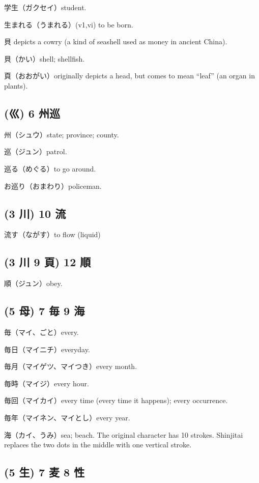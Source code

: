 学生（ガクセイ）student.

生まれる（うまれる）(v1,vi) to be born.

貝 depicts a cowry (a kind of seashell used as money in ancient China).

貝（かい）shell; shellfish.

頁（おおがい）originally depicts a head,
but comes to mean ``leaf'' (an organ in plants).

\subsection{(巛) 6 州巡}

州（シュウ）state; province; county.

巡（ジュン）patrol.

巡る（めぐる）to go around.

お巡り（おまわり）policeman.

\subsection{(3 川) 10 流}

流す（ながす）to flow (liquid)

\subsection{(3 川 9 頁) 12 順}

順（ジュン）obey.

\subsection{(5 母) 7 毎 9 海}

毎（マイ、ごと）every.

毎日（マイニチ）everyday.

毎月（マイゲツ、マイつき）every month.

毎時（マイジ）every hour.

毎回（マイカイ）every time (every time it happens); every occurrence.

毎年（マイネン、マイとし）every year.

海（カイ、うみ）sea; beach.
The original character has 10 strokes.
Shinjitai replaces the two dots in the middle
with one vertical stroke.

\subsection{(5 生) 7 麦 8 性}

